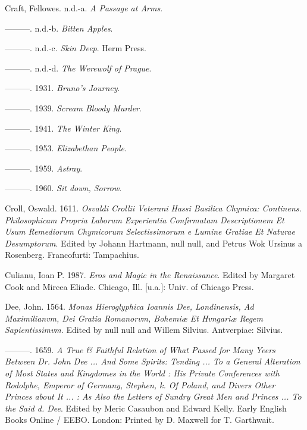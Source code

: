 \documentclass[
]{article}
\newlength{\cslhangindent}
\newenvironment{CSLReferences}[2] %
 {\begin{list}{}{%
  \setlength{\itemindent}{0pt}
  \setlength{\leftmargin}{0pt}
  \setlength{\parsep}{0pt}
  \ifodd #1
   \setlength{\leftmargin}{\cslhangindent}
   \setlength{\itemindent}{-1\cslhangindent}
  \fi
  \setlength{\itemsep}{#2\baselineskip}}}
 {\end{list}}
\begin{document}
\begin{CSLReferences}{1}{0}
Craft, Fellowes. n.d.-a. \emph{A Passage at Arms}.

---------. n.d.-b. \emph{Bitten Apples}.

---------. n.d.-c. \emph{Skin Deep}. Herm Press.

---------. n.d.-d. \emph{The Werewolf of Prague}.

---------. 1931. \emph{Bruno's Journey}.

---------. 1939. \emph{Scream Bloody Murder}.

---------. 1941. \emph{The Winter King}.

---------. 1953. \emph{Elizabethan People}.

---------. 1959. \emph{Astray}.

---------. 1960. \emph{Sit down, Sorrow}.

Croll, Oswald. 1611. \emph{Osvaldi Crollii Veterani Hassi Basilica
Chymica: Continens. Philosophicam Propria Laborum Experientia
Confirmatam Descriptionem Et Usum Remediorum Chymicorum Selectissimorum
e Lumine Gratiae Et Naturae Desumptorum}. Edited by Johann Hartmann,
null null, and Petrus Wok Ursinus a Rosenberg. Francofurti: Tampachius.

Culianu, Ioan P. 1987. \emph{Eros and Magic in the Renaissance}. Edited
by Margaret Cook and Mircea Eliade. Chicago, Ill. {[}u.a.{]}: Univ. of
Chicago Press.

Dee, John. 1564. \emph{Monas Hieroglyphica Ioannis Dee, Londinensis, Ad
Maximilianvm, Dei Gratia Romanorvm, Bohemiæ Et Hvngariæ Regem
Sapientissimvm}. Edited by null null and Willem Silvius. Antverpiae:
Silvius.

---------. 1659. \emph{A True \& Faithful Relation of What Passed for
Many Yeers Between Dr. John Dee ... And Some Spirits: Tending ... To a
General Alteration of Most States and Kingdomes in the World : His
Private Conferences with Rodolphe, Emperor of Germany, Stephen, k. Of
Poland, and Divers Other Princes about It ... : As Also the Letters of
Sundry Great Men and Princes ... To the Said d. Dee}. Edited by Meric
Casaubon and Edward Kelly. Early English Books Online / EEBO. London:
Printed by D. Maxwell for T. Garthwait.


\end{CSLReferences}
\end{document}

